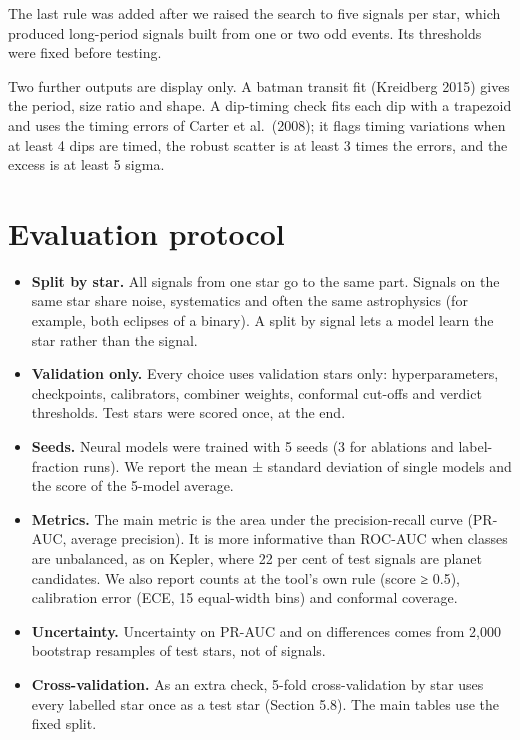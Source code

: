 \documentclass[fleqn,usenatbib]{mnras}
\providecommand{\tightlist}{\setlength{\itemsep}{0pt}\setlength{\parskip}{0pt}}
\begin{document}
The last rule was added after we raised the search to five signals per star, which produced long-period signals built from one or two odd events. Its thresholds were fixed before testing.

Two further outputs are display only. A batman transit fit (Kreidberg 2015) gives the period, size ratio and shape. A dip-timing check fits each dip with a trapezoid and uses the timing errors of Carter et al.~(2008); it flags timing variations when at least 4 dips are timed, the robust scatter is at least 3 times the errors, and the excess is at least 5 sigma.

\section{Evaluation protocol}

\begin{itemize}
\tightlist
\item
  \textbf{Split by star.} All signals from one star go to the same part. Signals on the same star share noise, systematics and often the same astrophysics (for example, both eclipses of a binary). A split by signal lets a model learn the star rather than the signal.
\item
  \textbf{Validation only.} Every choice uses validation stars only: hyperparameters, checkpoints, calibrators, combiner weights, conformal cut-offs and verdict thresholds. Test stars were scored once, at the end.
\item
  \textbf{Seeds.} Neural models were trained with 5 seeds (3 for ablations and label-fraction runs). We report the mean ± standard deviation of single models and the score of the 5-model average.
\item
  \textbf{Metrics.} The main metric is the area under the precision-recall curve (PR-AUC, average precision). It is more informative than ROC-AUC when classes are unbalanced, as on Kepler, where 22 per cent of test signals are planet candidates. We also report counts at the tool's own rule (score ≥ 0.5), calibration error (ECE, 15 equal-width bins) and conformal coverage.
\item
  \textbf{Uncertainty.} Uncertainty on PR-AUC and on differences comes from 2,000 bootstrap resamples of test stars, not of signals.
\item
  \textbf{Cross-validation.} As an extra check, 5-fold cross-validation by star uses every labelled star once as a test star (Section 5.8). The main tables use the fixed split.
\end{itemize}
\end{document}
